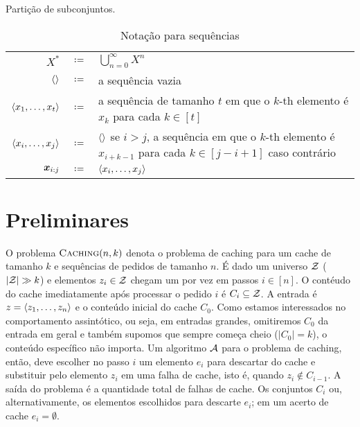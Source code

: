 Partição de subconjuntos.


\bgroup
	\renewcommand{\arraystretch}{1.2}
	\begin{table}[htbp]
	  \caption{Notação para sequências}
          \label{tbl:seq_notation}
	  \centering
	  \begin{tabular}{r c p{13cm}}
	    \toprule
            \(X^*\)
            &\(\coloneqq\)
            & \(\bigcup_{n = 0}^\infty X^n\)\\
            \(\langle\rangle\)
            & \(\coloneqq\)
            & a sequência vazia\\
            \(\langle x_1, \dotsc, x_t\rangle\)
            & \(\coloneqq\)
            & a sequência de tamanho \(t\) em que o \(k\)-th
              elemento é \(x_k\) para cada \(k \in [t]\) \\
            \(\langle x_i, \dotsc, x_j\rangle\)
            & \(\coloneqq\)
            & \(\langle\rangle\) se \(i > j\), a sequência em que o \(k\)-th elemento
              é \(x_{i + k -1}\) para cada \(k \in [j - i + 1]\)
              caso contrário\\
            \(\bm{x}_{i:j}\)
            & \(\coloneqq\)
            & \(\langle x_i, \dotsc, x_j\rangle\)\\
            \bottomrule
	  \end{tabular}
	\end{table}
\egroup

\section{Preliminares}

O problema \(\textsc{Caching}(n,k)\) denota o problema de caching para um cache de tamanho \(k\) e sequências de pedidos de tamanho \(n\). É dado um universo \(\mathcal{Z}\) (\(|\mathcal{Z}| \gg k\)) e elementos \(z_i \in \mathcal{Z}\) chegam um por vez em passos \(i \in [n]\). O contéudo do cache imediatamente após processar o pedido \(i\) é \(C_i \subseteq \mathcal{Z}\). A entrada é \(z = \langle z_1, \dotsc, z_n\rangle\) e o conteúdo inicial do cache \(C_0\). Como estamos interessados no comportamento assintótico, ou seja, em entradas grandes, omitiremos \(C_0\) da entrada em geral e também supomos que sempre começa cheio (\(|C_0| = k\)), o conteúdo específico não importa. Um algoritmo \(\mathcal{A}\) para o problema de caching, então, deve escolher no passo \(i\) um elemento \(e_i\) para descartar do cache e substituir pelo elemento \(z_i\) em uma falha de cache, isto é, quando \(z_i \notin C_{i-1}\). A saída do problema é a quantidade total de falhas de cache. Os conjuntos \(C_i\) ou, alternativamente, os elementos escolhidos para descarte \(e_i\); em um acerto de cache \(e_i = \emptyset\).

